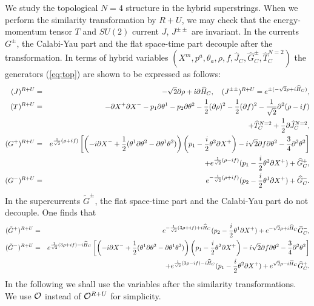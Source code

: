 \documentclass[a4paper,12pt]{article}
\begin{document}
We study the topological $N=4$ structure in the hybrid superstrings.
When we perform the similarity transformation by $R+U$, we may check
that the energy-momentum
tensor $T$ and $SU(2)$ current $J$, $J^{\pm\pm}$ are invariant.
In the currents $G^{\pm}$, the Calabi-Yau part and the flat space-time
part decouple after the transformation.
In terms of hybrid variables $(X^m,p^{a},\theta_{a},\rho,f,
\widehat{J}_{C}, \widehat{G}^{\pm}_{C},\widehat{T}^{N=2}_{C})$ 
the generators (\ref{eq:top})
are shown to be expressed 
as follows:
\begin{eqnarray}
(J)^{R+U}&=&-\sqrt{2}\partial\rho+i\partial\widehat{H}_{C}, \quad
(J^{\pm\pm})^{R+U}=e^{\pm (-\sqrt{2}\rho+i\widehat{H}_{C})},\nonumber\\
(T)^{R+U}&=& 
-\partial X^{+}\partial X^{-}
-p_{1}\partial\theta^{1}
-p_{2}\partial\theta^{2}-{1\over2}(\partial\rho)^{2}
-{1\over2}(\partial f)^{2}
-{1\over\sqrt{2}}\partial^{2}(\rho-i f)\nonumber\\
&&
+\widehat{T}^{N=2}_{C}+{1\over2}\partial \widehat{J}^{N=2}_{C},
\nonumber\\
(G^{+})^{R+U}&=&
e^{{1\over\sqrt{2}}(\rho+i f)} 
\left[
\left(
-i\partial X^{-}+{1\over2}(\theta^1\partial\theta^2-\partial\theta^1\theta^2)
\right)
\left(p_{1}-{i\over2}\theta^2\partial X^{+}\right)
-i\sqrt{2}\partial f \partial \theta^{2}
-{3\over4}\partial^2\theta^2
\right]\nonumber\\
&&+e^{{1\over\sqrt{2}}(\rho-i f)}(p_{1}-{i\over2}\theta^{2}\partial X^{+})
+\widehat{G}^{+}_{C}, \nonumber\\
(G^{-})^{R+U}&=& e^{-{i\over\sqrt{2}}(\rho+if)}
(p_{2}-{i\over2}\theta^1\partial X^{+})+\widehat{G}^{-}_{C}.
\label{eq:top2}
\end{eqnarray}
In the supercurrents $\tilde{G}^{\pm}$, the flat space-time part and
the Calabi-Yau part do not decouple. One finds that
\begin{eqnarray}
(\tilde{G}^{+})^{R+U}&=&
e^{-{1\over\sqrt{2}}(3\rho+i f)+i\widehat{H}_{C}}
(p_{2}-{i\over2}\theta^1\partial X^{+})
+e^{-\sqrt{2}\rho+i\widehat{H}_{C}}\widehat{G}^{-}_{C},\nonumber\\
(\tilde{G}^{-})^{R+U}&=&
e^{{1\over\sqrt{2}}(3\rho+i f)-i\widehat{H}_{C}} 
\left[
\left(
-i\partial X^{-}+{1\over2}(\theta^1\partial\theta^2-\partial\theta^1\theta^2)
\right)
\left(p_{1}-{i\over2}\theta^2\partial X^{+}\right)
-i\sqrt{2}\partial f \partial \theta^{2}
-{3\over4}\partial^2\theta^2
\right]\nonumber\\
&&+e^{{1\over\sqrt{2}}(3\rho-i f)-i\widehat{H}_{C}}
(p_{1}-{i\over2}\theta^{2}\partial X^{+})
+e^{\sqrt{2}\rho-i\widehat{H}_{C}}\widehat{G}^{+}_{C}.
\end{eqnarray}
In the following we shall use the variables after the similarity
transformations. We use ${\cal O}$ instead of ${\cal O}^{R+U}$ for
simplicity.
\end{document}

